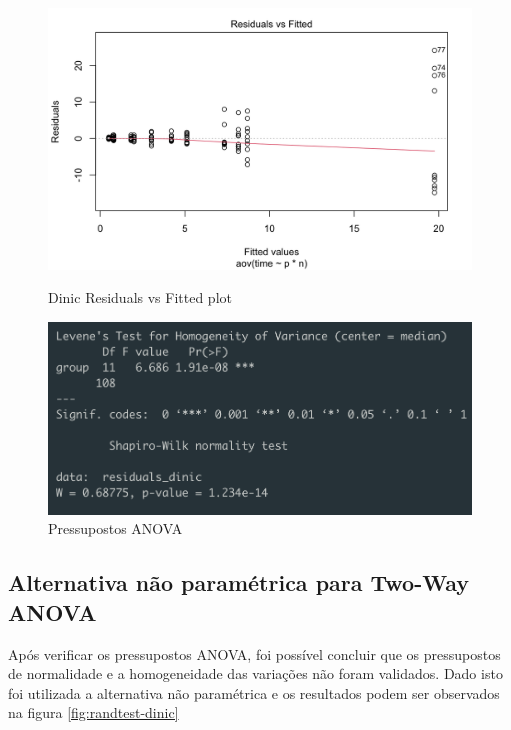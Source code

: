 \documentclass{uofa-eng-assignment}
\begin{document}
\begin{figure}[h]
    \begin{minipage}{0.45\textwidth}
        \centering
        \includegraphics[width=1\textwidth]{resplot-dinic.png}
        \caption{Dinic Residuals vs Fitted plot}
        \label{fig:resplot-dinic}
    \end{minipage}
    \hfill
    \begin{minipage}{0.45\textwidth}
        \centering
        \includegraphics[width=1\textwidth]{pressupostos_dinic.png}
        \caption{Pressupostos ANOVA}
        \label{fig:pressupostos-dinic}
    \end{minipage}
\end{figure}

\subsection{Alternativa não paramétrica para Two-Way ANOVA}

Após verificar os pressupostos ANOVA, foi possível concluir que os pressupostos de normalidade e a homogeneidade das variações não foram validados. Dado isto foi utilizada a alternativa não paramétrica e os resultados podem ser observados na figura \ref{fig:randtest-dinic}
\end{document}
